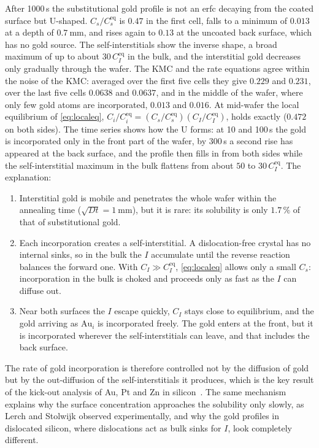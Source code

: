\documentclass[11pt,a4paper]{article}
\numberwithin{equation}{section}
\theoremstyle{remark}
\begin{document}
After 1000\,s the substitutional gold profile is not an erfc decaying from the coated surface
but U-shaped. $C_s/C_s^{\mathrm{eq}}$ is $0.47$ in the first cell, falls to a minimum of $0.013$ at a
depth of $\SI{0.7}{\milli\metre}$, and rises again to $0.13$ at the uncoated back surface, which has no
gold source. The self-interstitials show the inverse shape, a broad maximum of up to about $30\,C_I^{\mathrm{eq}}$
in the bulk, and the interstitial gold decreases only gradually through the wafer.
The KMC and the rate equations agree within the noise of the KMC: averaged over the first five cells
they give $0.229$ and $0.231$, over the last five cells $0.0638$ and $0.0637$, and in the middle of the
wafer, where only few gold atoms are incorporated, $0.013$ and $0.016$. At mid-wafer the local
equilibrium of \cref{eq:localeq}, $C_i/C_i^{\mathrm{eq}} = (C_s/C_s^{\mathrm{eq}})(C_I/C_I^{\mathrm{eq}})$,
holds exactly ($0.472$ on both sides). The time series shows how the U forms: at 10 and 100\,s the gold is
incorporated only in the front part of the wafer, by 300\,s a second rise has appeared at the back
surface, and the profile then fills in from both sides while the self-interstitial maximum in the bulk flattens from
about $50$ to $30\,C_I^{\mathrm{eq}}$. The explanation:
\begin{enumerate}\setlength{\itemsep}{2pt}
  \item Interstitial gold is mobile and penetrates the whole wafer within the annealing time
    ($\sqrt{Dt} = \SI{1}{\milli\metre}$), but it is rare: its solubility is only $1.7\,\%$ of that of
    substitutional gold.
  \item Each incorporation creates a self-interstitial. A dislocation-free crystal has no internal
    sinks, so in the bulk the $I$ accumulate until the reverse reaction balances the forward one. With
    $C_I \gg C_I^{\mathrm{eq}}$, \cref{eq:localeq} allows only a small $C_s$: incorporation in the bulk
    is choked and proceeds only as fast as the $I$ can diffuse out.
  \item Near both surfaces the $I$ escape quickly, $C_I$ stays close to equilibrium, and the gold
    arriving as $\mathrm{Au}_i$ is incorporated freely. The gold enters at the front, but it is
    incorporated wherever the self-interstitials can leave, and that includes the back surface.
\end{enumerate}
The rate of gold incorporation is therefore controlled not by the diffusion of gold but by the
out-diffusion of the self-interstitials it produces, which is the key result of the kick-out analysis
of Au, Pt and Zn in silicon~\citep{gosele1980, lerch1998}. The same mechanism explains why the surface
concentration approaches the solubility only slowly, as Lerch and Stolwijk observed experimentally, and
why the gold profiles in dislocated silicon, where dislocations act as bulk sinks for $I$, look
completely different.
\end{document}
